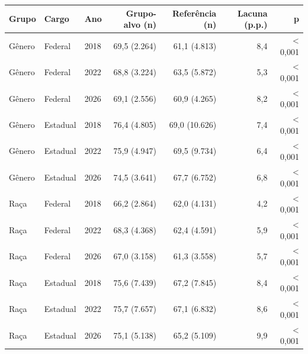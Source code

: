 \begin{tabular}{lllrrrr}
\toprule
Grupo & Cargo & Ano & Grupo-alvo (n) & Referência (n) & Lacuna (p.p.) & p \\
\midrule
Gênero & Federal & 2018 & 69,5 (2.264) & 61,1 (4.813) & 8,4 & < 0,001 \\
Gênero & Federal & 2022 & 68,8 (3.224) & 63,5 (5.872) & 5,3 & < 0,001 \\
Gênero & Federal & 2026 & 69,1 (2.556) & 60,9 (4.265) & 8,2 & < 0,001 \\
Gênero & Estadual & 2018 & 76,4 (4.805) & 69,0 (10.626) & 7,4 & < 0,001 \\
Gênero & Estadual & 2022 & 75,9 (4.947) & 69,5 (9.734) & 6,4 & < 0,001 \\
Gênero & Estadual & 2026 & 74,5 (3.641) & 67,7 (6.752) & 6,8 & < 0,001 \\
Raça & Federal & 2018 & 66,2 (2.864) & 62,0 (4.131) & 4,2 & < 0,001 \\
Raça & Federal & 2022 & 68,3 (4.368) & 62,4 (4.591) & 5,9 & < 0,001 \\
Raça & Federal & 2026 & 67,0 (3.158) & 61,3 (3.558) & 5,7 & < 0,001 \\
Raça & Estadual & 2018 & 75,6 (7.439) & 67,2 (7.845) & 8,4 & < 0,001 \\
Raça & Estadual & 2022 & 75,7 (7.657) & 67,1 (6.832) & 8,6 & < 0,001 \\
Raça & Estadual & 2026 & 75,1 (5.138) & 65,2 (5.109) & 9,9 & < 0,001 \\
\bottomrule
\end{tabular}
